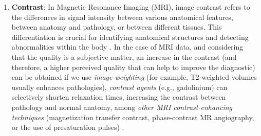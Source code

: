 \begin{enumerate}
{    to recognize the pathology}.
\item \textbf{Contrast}: In Magnetic Resonance Imaging (MRI),
    image contrast refers to the differences in signal intensity
    between various anatomical features, between anatomy and
    pathology, or between different tissues. This differentiation is
    crucial for identifying anatomical structures and detecting
    abnormalities within the body \cite{westbrook2018mri}. In the case of MRI data, and considering that the quality
  is a subjective matter, an increase in the contrast (and therefore,
  a higher perceived quality that can help to improve the diagnostic)
  can be obtained if we use \emph{image weighting} (for example,
  T2-weighted volumes usually enhances pathologies), \emph{contrast agents}
  (e.g., gadolinium) can selectively shorten relaxation times,
  increasing the contrast between pathology and normal anatomy, among
  \emph{other MRI contrast-enhancing techniques} (magnetization
  transfer contrast, phase-contrast MR angiography, or the use of
  presaturation pulses) \cite{westbrook2018mri}.
\end{enumerate}
